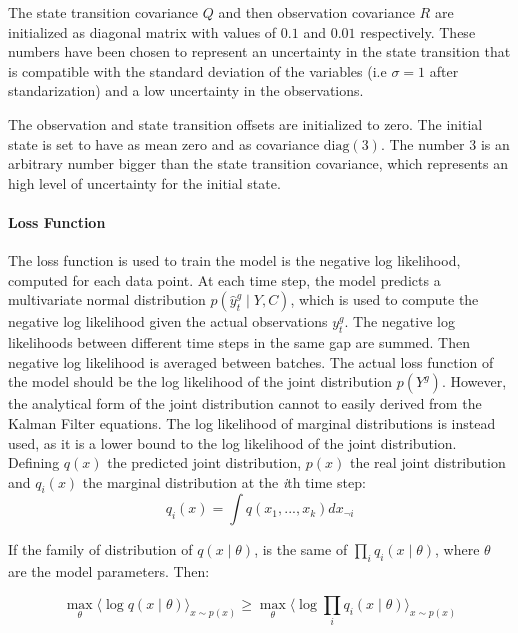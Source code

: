 \documentclass{article}
\newcommand{\E}[1]{\langle #1 \rangle} %
\begin{document}
The state transition covariance $Q$ and then observation covariance $R$ are initialized as diagonal matrix with values of $0.1$ and $0.01$ respectively. These numbers have been chosen to represent an uncertainty in the state transition that is compatible with the standard deviation of the variables (i.e $\sigma = 1$ after standarization) and a low uncertainty in the observations. 

The observation and state transition offsets are initialized to zero. The initial state is set to have as mean zero and as covariance $\text{diag}(3)$. The number 3 is an arbitrary number bigger than the state transition covariance, which represents an high level of uncertainty for the initial state.  

\paragraph{Loss Function}

The loss function is used to train the model is the negative log likelihood, computed for each data point. At each time step, the model predicts a multivariate normal distribution $p(\hat{y}^g_t \mid Y, C)$, which is used to compute the negative log likelihood given the actual observations $y_t^g$. The negative log likelihoods between different time steps in the same gap are summed. Then negative log likelihood is averaged between batches.
The actual loss function of the model should be the log likelihood of the joint distribution $p(Y^g)$. However, the analytical form of the joint distribution cannot to easily derived from the Kalman Filter equations. The log likelihood of marginal distributions is instead used, as it is a lower bound to the log likelihood of the joint distribution. Defining $q(x)$ the predicted joint distribution, $p(x)$ the real joint distribution and $q_i(x)$ the marginal distribution at the \textit{i}th time step:
\begin{equation*}
    q_i(x) = \int q(x_1, ..., x_k)dx_{\neg i}
\end{equation*}

If the family of distribution of $q(x \mid \theta)$,  is the same of $\prod_i q_i(x \mid \theta)$, where $\theta$ are the model parameters. Then:

\begin{equation}\label{eq:log_joint_geq}
    \max_\theta \E{\log q(x\mid \theta)}_{x \sim p(x)} \geq \max_\theta \E{\log \prod_i q_i(x\mid \theta)}_{x \sim p(x)}
\end{equation}
\end{document}
